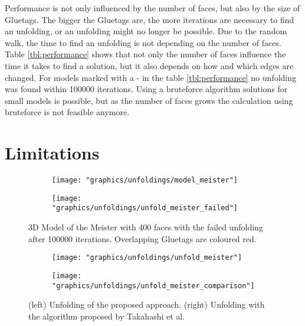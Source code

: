 \documentclass[draft,final]{vutinfth} %
\begin{document}
\label{tbl:performance}
\endgroup

Performance is not only influenced by the number of faces, but also by the size of Gluetags. The bigger the Gluetags are, the more iterations are necessary to find an unfolding, or an unfolding might no longer be possible. Due to the random walk, the time to find an unfolding is not depending on the number of faces. Table \ref{tbl:performance} shows that not only the number of faces influence the time it takes to find a solution, but it also depends on how and which edges are changed. For models marked with a - in the table \ref{tbl:performance} no unfolding was found within 100000 iterations. Using a bruteforce algorithm solutions for small models is possible, but as the number of faces grows the calculation using bruteforce is not feasible anymore.


\section{Limitations}
\label{sec:limitations}

\begin{figure}
  \begin{subfigure}[b]{0.475\textwidth}
    \texttt{[image: "graphics/unfoldings/model\_meister"]}
  \end{subfigure}
  \begin{subfigure}[b]{0.475\textwidth}
    \texttt{[image: "graphics/unfoldings/unfold\_meister\_failed"]}
  \end{subfigure}
  
  \caption{3D Model of the Meister with 400 faces with the failed unfolding after 100000 iterations. Overlapping Gluetags are coloured red.}
  \label{fig:meister_failed}
\end{figure}

\begin{figure}
  \begin{subfigure}[b]{0.475\textwidth}
    \texttt{[image: "graphics/unfoldings/unfold\_meister"]}
  \end{subfigure}
  \begin{subfigure}[b]{0.475\textwidth}
    \texttt{[image: "graphics/unfoldings/unfold\_meister\_comparison"]}
  \end{subfigure}
  
  \caption{(left) Unfolding of the proposed approach. (right) Unfolding with the algorithm proposed by Takahashi et al.\cite{takahashi2011optimized}}
  \label{fig:meister_comparison}
\end{figure}
\end{document}
